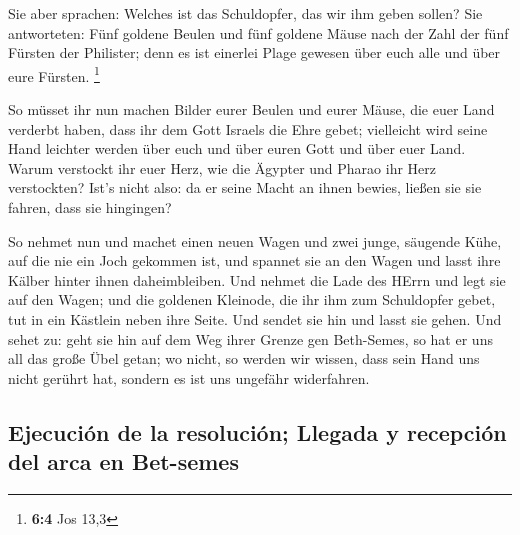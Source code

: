  Sie aber sprachen: Welches ist das Schuldopfer, das wir
ihm geben sollen? Sie antworteten: Fünf goldene Beulen und fünf goldene
Mäuse nach der Zahl der fünf Fürsten der Philister; denn es ist einerlei
Plage gewesen über euch alle und über eure Fürsten. \footnote{\textbf{6:4}
  Jos 13,3}

 So müsset ihr nun machen Bilder eurer Beulen und eurer
Mäuse, die euer Land verderbt haben, dass ihr dem Gott Israels die Ehre
gebet; vielleicht wird seine Hand leichter werden über euch und über
euren Gott und über euer Land.  Warum verstockt ihr euer
Herz, wie die Ägypter und Pharao ihr Herz verstockten? Ist's nicht also:
da er seine Macht an ihnen bewies, ließen sie sie fahren, dass sie
hingingen?

 So nehmet nun und machet einen neuen Wagen und zwei
junge, säugende Kühe, auf die nie ein Joch gekommen ist, und spannet sie
an den Wagen und lasst ihre Kälber hinter ihnen daheimbleiben.
 Und nehmet die Lade des HErrn und legt sie auf den Wagen;
und die goldenen Kleinode, die ihr ihm zum Schuldopfer gebet, tut in ein
Kästlein neben ihre Seite. Und sendet sie hin und lasst sie gehen.
 Und sehet zu: geht sie hin auf dem Weg ihrer Grenze gen
Beth-Semes, so hat er uns all das große Übel getan; wo nicht, so werden
wir wissen, dass sein Hand uns nicht gerührt hat, sondern es ist uns
ungefähr widerfahren.

\hypertarget{ejecuciuxf3n-de-la-resoluciuxf3n-llegada-y-recepciuxf3n-del-arca-en-bet-semes}{%
\subsection{Ejecución de la resolución; Llegada y recepción del arca en
Bet-semes}\label{ejecuciuxf3n-de-la-resoluciuxf3n-llegada-y-recepciuxf3n-del-arca-en-bet-semes}}

